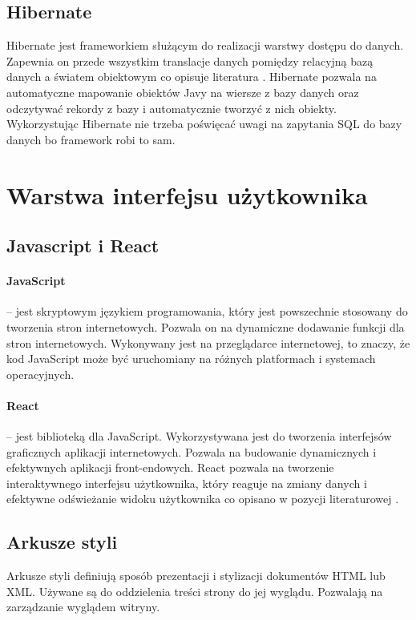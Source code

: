 \subsection{Hibernate}
\label{hibernate:label}
Hibernate jest frameworkiem służącym do realizacji warstwy dostępu do danych. Zapewnia on przede wszystkim translacje danych pomiędzy relacyjną bazą danych a światem obiektowym co opisuje literatura \cite{JHibernate}. Hibernate pozwala na automatyczne mapowanie obiektów Javy na wiersze z bazy danych oraz odczytywać rekordy z bazy i automatycznie tworzyć z nich obiekty. Wykorzystując Hibernate nie trzeba poświęcać uwagi na zapytania SQL do bazy danych bo framework robi to sam.


\section{Warstwa interfejsu użytkownika}

\subsection{Javascript i React}
\paragraph{JavaScript} -- jest skryptowym językiem programowania, który jest powszechnie stosowany do tworzenia stron internetowych. Pozwala on na dynamiczne dodawanie funkcji dla stron internetowych. Wykonywany jest na przeglądarce internetowej, to znaczy, że kod JavaScript może być uruchomiany na różnych platformach i systemach operacyjnych. 

\paragraph{React} -- jest biblioteką dla JavaScript. Wykorzystywana jest do tworzenia interfejsów graficznych aplikacji internetowych. Pozwala na budowanie dynamicznych i efektywnych aplikacji front-endowych. React  pozwala na tworzenie interaktywnego interfejsu użytkownika, który reaguje na zmiany danych i efektywne odświeżanie widoku użytkownika co opisano w pozycji literaturowej \cite{react}. 

\subsection{Arkusze styli}
Arkusze styli definiują sposób prezentacji i stylizacji dokumentów HTML lub XML. Używane są do oddzielenia treści strony do jej wyglądu. Pozwalają na zarządzanie wyglądem witryny. 
